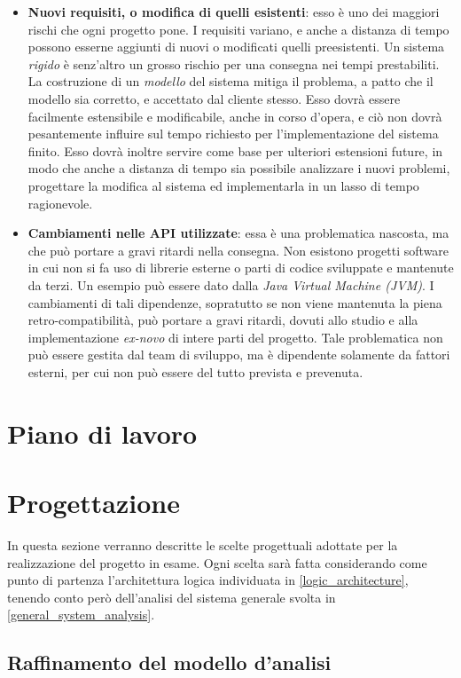 \documentclass[a4paper,12pt]{report}
\begin{document}
\begin{itemize}
	\item \textbf{Nuovi requisiti, o modifica di quelli esistenti}: esso è uno dei maggiori rischi che ogni progetto pone. I requisiti variano, e anche a distanza di tempo possono esserne aggiunti di nuovi o modificati quelli preesistenti. Un sistema \emph{rigido} è senz'altro un grosso rischio per una consegna nei tempi prestabiliti. La costruzione di un \emph{modello} del sistema mitiga il problema, a patto che il modello sia corretto, e accettato dal cliente stesso. Esso dovrà essere facilmente estensibile e modificabile, anche in corso d'opera, e ciò non dovrà pesantemente influire sul tempo richiesto per l'implementazione del sistema finito. Esso dovrà inoltre servire come base per ulteriori estensioni future, in modo che anche a distanza di tempo sia possibile analizzare i nuovi problemi, progettare la modifica al sistema ed implementarla in un lasso di tempo ragionevole. 
	\item \textbf{Cambiamenti nelle API utilizzate}: essa è una problematica nascosta, ma che può portare a gravi ritardi nella consegna. Non esistono progetti software in cui non si fa uso di librerie esterne o parti di codice sviluppate e mantenute da terzi. Un esempio può essere dato dalla \emph{Java Virtual Machine (JVM)}. I cambiamenti di tali dipendenze, sopratutto se non viene mantenuta la piena retro-compatibilità, può portare a gravi ritardi, dovuti allo studio e alla implementazione \emph{ex-novo} di intere parti del progetto. Tale problematica non può essere gestita dal team di sviluppo, ma è dipendente solamente da fattori esterni, per cui non può essere del tutto prevista e prevenuta.
\end{itemize}

\chapter{Piano di lavoro}

\chapter{Progettazione}

In questa sezione verranno descritte le scelte progettuali adottate per la realizzazione del progetto in esame. Ogni scelta sarà fatta considerando come punto di partenza l'architettura logica individuata in \autoref{logic_architecture}, tenendo conto però dell'analisi del sistema generale svolta in \autoref{general_system_analysis}.

\section{Raffinamento del modello d'analisi}
\end{document}
